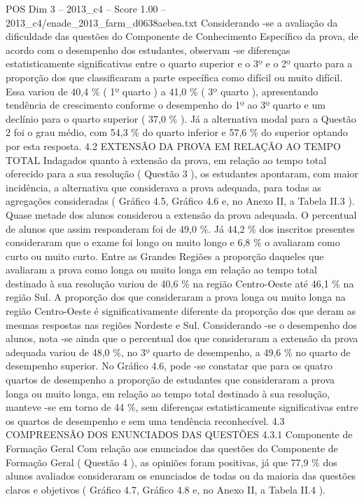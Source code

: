 \begin{textsample}{POS Dim 3 – 2013\_c4 – Score 1.00 – 2013\_c4/enade\_2013\_farm\_d0638aebea.txt}
Considerando -se a avaliação da dificuldade das questões do Componente de Conhecimento Específico da prova, de acordo com o desempenho dos estudantes, observam -se diferenças estatisticamente significativas entre o quarto superior e o 3º e o 2º quarto para a proporção dos que classificaram a parte específica como difícil ou muito difícil.
Essa variou de 40,4 \% ( 1º quarto ) a 41,0 \% ( 3º quarto ), apresentando tendência de crescimento conforme o desempenho do 1º ao 3º quarto e um declínio para o quarto superior ( 37,0 \% ).
Já a alternativa modal para a Questão 2 foi o grau médio, com 54,3 \% do quarto inferior e 57,6 \% do superior optando por esta resposta. 4.2 EXTENSÃO DA PROVA EM RELAÇÃO AO TEMPO TOTAL Indagados quanto à extensão da prova, em relação ao tempo total oferecido para a sua resolução ( Questão 3 ), os estudantes apontaram, com maior incidência, a alternativa que considerava a prova adequada, para todas as agregações consideradas ( Gráfico 4.5, Gráfico 4.6 e, no Anexo II, a Tabela II.3 ).
Quase metade dos alunos considerou a extensão da prova adequada.
O percentual de alunos que assim responderam foi de 49,0 \%.
Já 44,2 \% dos inscritos presentes consideraram que o exame foi longo ou muito longo e 6,8 \% o avaliaram como curto ou muito curto.
Entre as Grandes Regiões a proporção daqueles que avaliaram a prova como longa ou muito longa em relação ao tempo total destinado à sua resolução variou de 40,6 \% na região Centro-Oeste até 46,1 \% na região Sul.
A proporção dos que consideraram a prova longa ou muito longa na região Centro-Oeste é significativamente diferente da proporção dos que deram as mesmas respostas nas regiões Nordeste e Sul.
Considerando -se o desempenho dos alunos, nota -se ainda que o percentual dos que consideraram a extensão da prova adequada variou de 48,0 \%, no 3º quarto de desempenho, a 49,6 \% no quarto de desempenho superior.
No Gráfico 4.6, pode -se constatar que para os quatro quartos de desempenho a proporção de estudantes que consideraram a prova longa ou muito longa, em relação ao tempo total destinado à sua resolução, manteve -se em torno de 44 \%, sem diferenças estatisticamente significativas entre os quartos de desempenho e sem uma tendência reconhecível. 4.3 COMPREENSÃO DOS ENUNCIADOS DAS QUESTÕES 4.3.1 Componente de Formação Geral Com relação aos enunciados das questões do Componente de Formação Geral ( Questão 4 ), as opiniões foram positivas, já que 77,9 \% dos alunos avaliados consideraram os enunciados de todas ou da maioria das questões claros e objetivos ( Gráfico 4.7, Gráfico 4.8 e, no Anexo II, a Tabela II.4 ).

\end{textsample}
